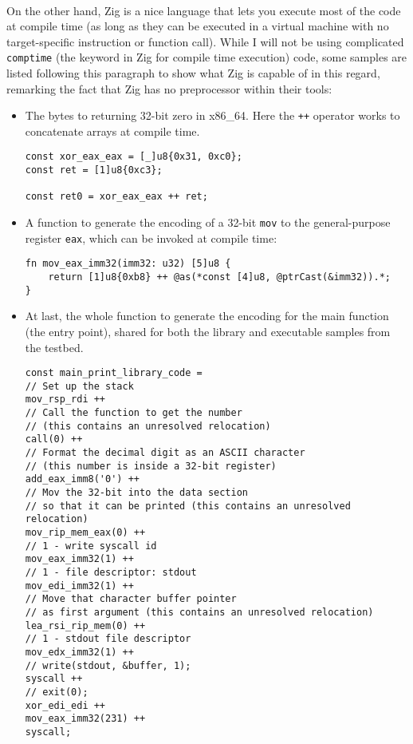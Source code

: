 \documentclass[12pt]{article}
\begin{document}
	\paragraph{}On the other hand, Zig is a nice language that lets you execute most of the code at compile time (as long as they can be executed in a virtual machine with no target-specific instruction or function call). While I will not be using complicated \verb|comptime| (the keyword in Zig for compile time execution) code, some samples are listed following this paragraph to show what Zig is capable of in this regard, remarking the fact that Zig has no preprocessor within their tools:
	
	\begin{itemize}
		\item The bytes to returning 32-bit zero in x86\_64. Here the \verb|++| operator works to concatenate arrays at compile time.
		\begin{verbatim}
const xor_eax_eax = [_]u8{0x31, 0xc0};
const ret = [1]u8{0xc3};
			
const ret0 = xor_eax_eax ++ ret;
		\end{verbatim}
		\item A function to generate the encoding of a 32-bit \verb|mov| to the general-purpose register \verb|eax|, which can be invoked at compile time:
		\begin{verbatim}
fn mov_eax_imm32(imm32: u32) [5]u8 {
	return [1]u8{0xb8} ++ @as(*const [4]u8, @ptrCast(&imm32)).*;
}
		\end{verbatim}
		\item At last, the whole function to generate the encoding for the main function (the entry point), shared for both the library and executable samples from the testbed.
		\begin{verbatim}
const main_print_library_code = 
// Set up the stack
mov_rsp_rdi ++
// Call the function to get the number
// (this contains an unresolved relocation)
call(0) ++
// Format the decimal digit as an ASCII character
// (this number is inside a 32-bit register)
add_eax_imm8('0') ++
// Mov the 32-bit into the data section
// so that it can be printed (this contains an unresolved relocation)
mov_rip_mem_eax(0) ++ 
// 1 - write syscall id
mov_eax_imm32(1) ++
// 1 - file descriptor: stdout
mov_edi_imm32(1) ++
// Move that character buffer pointer
// as first argument (this contains an unresolved relocation)
lea_rsi_rip_mem(0) ++ 
// 1 - stdout file descriptor
mov_edx_imm32(1) ++
// write(stdout, &buffer, 1);
syscall ++
// exit(0);
xor_edi_edi ++
mov_eax_imm32(231) ++
syscall;
		\end{verbatim}
	\end{itemize}
\end{document}
